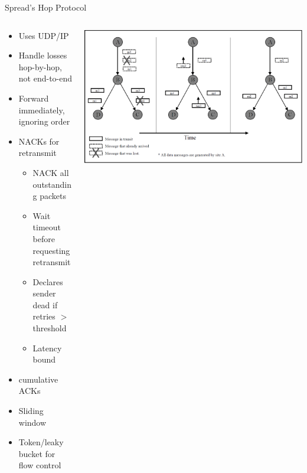 \documentclass[pdftex]{beamer}
\begin{document}
\begin{frame}{Spread's Hop Protocol}
\begin{columns}
\begin{column}{.5\textwidth}

\begin{itemize}
	\item Uses UDP/IP
	\item Handle losses hop-by-hop, not end-to-end
	\item Forward immediately, ignoring order
	\item NACKs for retransmit
	\begin{itemize}
		\item NACK all outstanding packets
		\item Wait timeout before requesting retransmit
		\item Declares sender dead if retries $>$ threshold
		\item Latency bound
	\end{itemize}
	
	\item cumulative ACKs
	\item Sliding window
	\item Token/leaky bucket for flow control

\end{itemize}
\end{column}
	
\begin{column}{.5\textwidth}
\includegraphics[width=\textwidth]{spread_hop_protocol}
\end{column}

\end{columns}
\end{frame}
\end{document}
